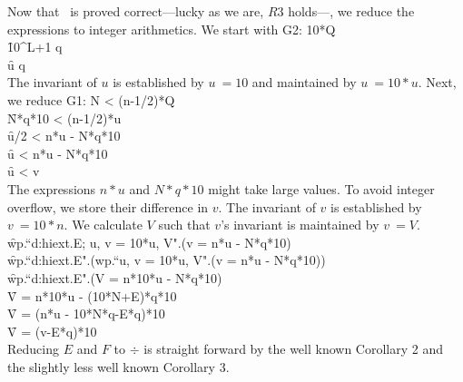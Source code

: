 Now that \out\ is proved correct---lucky as we are, $R3$ holds---,
we reduce the expressions to integer arithmetics. We start with 
\nf G2: 10*Q \\
\f 10^{L+1} \le q\\
\f u \le q\\

The invariant of $u$ is established by $u \:= 10$ and maintained
by $u \:= 10*u$.
\filbreak
Next, we reduce
\nf G1:  N < (n-1/2)*Q \\
\f   N*q*10 < (n-1/2)*u\\
\f   u/2 < n*u - N*q*10\\
\f   u  < n*u - N*q*10\\
\f   u  < v\\
\filbreak
The expressions $n*u$ and $N*q*10$ might take large values. To avoid integer
overflow, we store their difference in $v$. The invariant of $v$ is established
by $v \:= 10*n$.
We calculate $V$ such that $v$'s invariant is maintained by $v \:= V$.
\f   wp.``d:hiext.E; u, v \:= 10*u, V".(v = n*u - N*q*10)\\
\f   wp.``d:hiext.E".\bigl(wp.``u, v \:= 10*u, V".(v = n*u - N*q*10)\bigr)\\
\f   wp.``d:hiext.E".(V = n*10*u - N*q*10)\\
\f   V = n*10*u - (10*N+E)*q*10\\
\f   V = (n*u - 10*N*q-E*q)*10\\
\f   V = (v-E*q)*10\\
\filbreak
Reducing $E$ and $F$ to $\div$ is straight forward by the well
known Corollary 2 and the slightly less well known Corollary 3.


